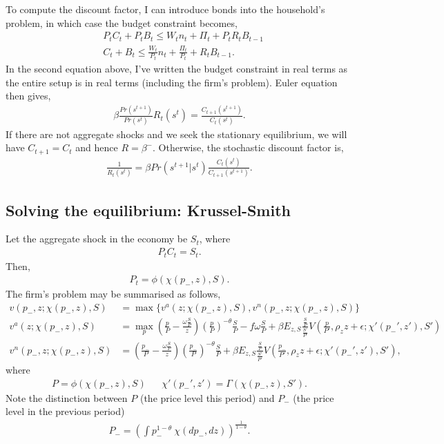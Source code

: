 To compute the discount factor, I can introduce bonds into the household's problem, in which case the budget constraint becomes,
\begin{align*}
    & P_t C_t + P_t B_t \leq W_t n_t + \Pi_t + P_t R_t B_{t-1} \\
    & C_t + B_t \leq \frac{W_t}{P_t}n_t + \frac{\Pi_t}{P_t} + R_t B_{t-1}.
\end{align*}
In the second equation above, I've written the budget constraint in real terms as the entire setup is in real terms (including the firm's problem). Euler equation then gives,
\begin{align*}
    \beta \frac{Pr(s^{t+1})}{Pr(s^t)} R_t(s^t) = \frac{C_{t+1}(s^{t+1})}{C_t(s^t)}.
\end{align*}
If there are not aggregate shocks and we seek the stationary equilibrium, we will have $C_{t+1} = C_t$ and hence $R = \beta^{-}$. Otherwise, the stochastic discount factor is,
\begin{align*}
    \frac{1}{R_t(s^t)} = \beta Pr(s^{t+1} \vert s^t)  \frac{C_t(s^t)}{C_{t+1}(s^{t+1})}.
\end{align*}


\subsection{Solving the equilibrium: Krussel-Smith}
Let the aggregate shock in the economy be $S_t$, where
\begin{align*}
    P_t C_t  = S_t.
\end{align*}
Then,
\begin{align*}
    P_t = \phi(\chi(p_{-}, z), S).
\end{align*}
The firm's problem may be summarised as follows,
\begin{align*}
    v(p_{-}, z; \chi(p_{-}, z), S) &= \max\{ v^a(z; \chi(p_{-}, z), S), v^n(p_{-}, z; \chi(p_{-}, z), S) \}\\
    v^a(z; \chi(p_{-}, z), S) &= \max_p \left( \frac{p}{P} - \frac{\omega \frac{S}{P}}{z} \right) \left(\frac{p}{P}\right)^{-\theta} \frac{S}{P} - f \omega \frac{S}{P} + \beta E_{z, S} \frac{\frac{S}{P}}{\frac{S'}{P'}} V\left(\frac{p}{P'}, \rho_z z + \epsilon; \chi'(p_{-}', z'), S' \right)\\
    v^n(p_{-}, z; \chi(p_{-}, z), S) &= \left(\frac{p_{-}}{P} - \frac{\omega \frac{S}{P}}{z}\right) \left(\frac{p_{-}}{P}\right)^{-\theta} \frac{S}{P} + \beta E_{z, S}  \frac{\frac{S}{P}}{\frac{S'}{P'}} V\left(\frac{p_{-}}{P'}, \rho_z z + \epsilon; \chi'(p_{-}', z'), S' \right),
\end{align*}
where
\begin{align*}
    P = \phi(\chi(p_{-}, z), S) && \chi'(p_{-}', z') = \Gamma(\chi(p_{-}, z), S').
\end{align*}
Note the distinction between $P$ (the price level this period) and $P_{-}$ (the price level in the previous period)
\begin{align*}
    P_{-} = \left(\int p_{-}^{1-\theta} \ \chi(dp_{-}, dz)\right)^{\frac{1}{1-\theta}}.
\end{align*}

